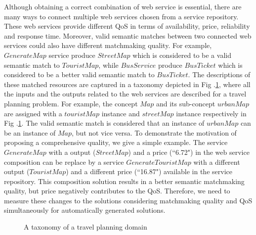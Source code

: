 \documentclass{llncs}
\begin{document}
Although obtaining a correct combination of web service is essential, there are many ways to connect multiple web services chosen from a service repository. These web services provide different QoS in terms of availability, price, reliability and response time. Moreover, valid semantic matches between two connected web services could also have different matchmaking quality. For example, $Generate Map$ service produce $StreetMap$ which is considered to be a valid semantic match to $TouristMap$, while $Bus Service$ produce $BusTicket$ which is considered to be a better valid semantic match to $BusTicket$. The descriptions of these matched resources are captured in a taxonomy depicted in Fig .\ref{taxonomy}, where all the inputs and the outputs related to the web services are described for a travel planning problem. For example, the concept $Map$ and its sub-concept $urbanMap$ are assigned with a $touristMap$ instance and $streetMap$ instance respectively in Fig .\ref{taxonomy}. The valid semantic match is considered that an instance of $urban Map$ can be an instance of $Map$, but not vice versa. To demonstrate the motivation of proposing a comprehensive quality, we give a simple example. The service $GenerateMap$ with a output ($StreetMap$) and a price (``6.72") in the web service composition can be replace by a service $GenerateTouristMap$ with a different output ($TouristMap$) and a different price (``16.87") available in the service repository. This composition solution results in a better semantic matchmaking quality, but price negatively contributes to the QoS. Therefore, we need to measure these changes to the solutions considering matchmaking quality and QoS simultaneously for automatically generated solutions. 



\begin{figure}[h]
\centering
{}
 \caption{ A taxonomy of a travel planning domain}
 \label{taxonomy}
\end{figure}
\end{document}
